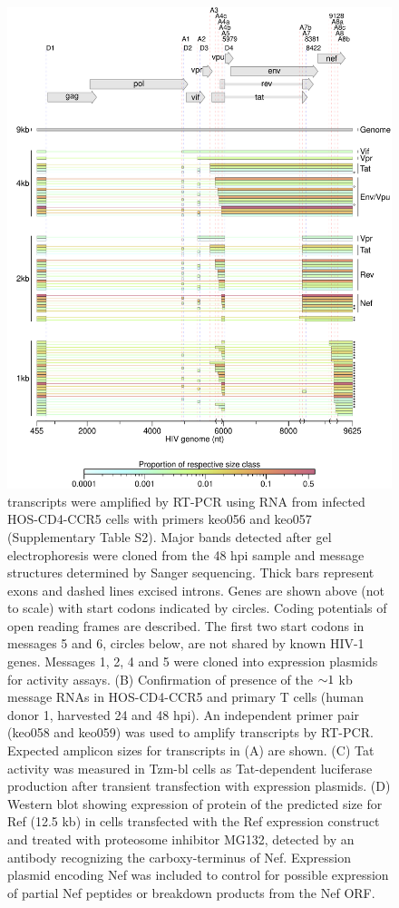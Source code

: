 \documentclass[../sherrill-Mix_thesis.tex]{subfiles}
\begin{document}
\begin{figure}
	\centering
	\includegraphics[width=\textwidth]{2.pdf}
	\caption[Novel transcripts utilizing acceptor A8c]{\hivEight{} transcripts were amplified by RT-PCR using RNA from infected HOS-CD4-CCR5 cells with primers keo056 and keo057 (Supplementary Table S2). Major bands detected after gel electrophoresis were cloned from the 48 hpi sample and message structures determined by Sanger sequencing. Thick bars represent exons and dashed lines excised introns. Genes are shown above (not to scale) with start codons indicated by circles. Coding potentials of open reading frames are described. The first two start codons in messages 5 and 6, circles below, are not shared by known HIV-1 genes. Messages 1, 2, 4 and 5 were cloned into expression plasmids for activity assays. (B) Confirmation of presence of the $\mathord{\sim}{}1$ kb message RNAs in HOS-CD4-CCR5 and primary \cdFour{} T cells (human donor 1, harvested 24 and 48 hpi). An independent primer pair (keo058 and keo059) was used to amplify transcripts by RT-PCR. Expected amplicon sizes for transcripts in (A) are shown. (C) Tat activity was measured in Tzm-bl cells as Tat-dependent luciferase production after transient transfection with expression plasmids. (D) Western blot showing expression of protein of the predicted size for Ref (12.5 kb) in cells transfected with the Ref expression construct and treated with proteosome inhibitor MG132, detected by an antibody recognizing the carboxy-terminus of Nef. Expression plasmid encoding Nef was included to control for possible expression of partial Nef peptides or breakdown products from the Nef ORF.}
	\label{figA8c}
\end{figure}
\end{document}
